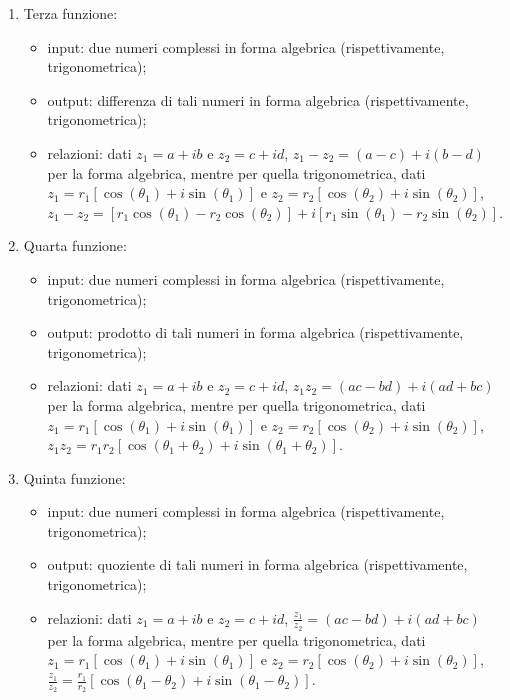 \documentclass[a4paper,10pt]{article}
\begin{document}
\begin{enumerate}
\begin{itemize}
	    \end{itemize}
	\item Terza funzione:
	    \begin{itemize}
	    	\item input: due numeri complessi in forma algebrica (rispettivamente, trigonometrica);
		\item output: differenza di tali numeri in forma algebrica (rispettivamente, trigonometrica);
		\item relazioni: dati $ z_1 = a + ib $ e $ z_2 = c + id $, $ z_1 - z_2 = (a - c) + i(b - d) $
		per la forma algebrica, mentre per quella trigonometrica, dati $ z_1 = r_1[\cos(\theta_1) + i\sin(\theta_1)] $
		e $ z_2 = r_2[\cos(\theta_2) + i\sin(\theta_2)] $, $ z_1 - z_2 = [r_1\cos(\theta_1) - r_2\cos(\theta_2)] +
		i[r_1\sin(\theta_1) - r_2\sin(\theta_2)] $.
	    \end{itemize}
	\item Quarta funzione:
	    \begin{itemize}
	    	\item input: due numeri complessi in forma algebrica (rispettivamente, trigonometrica);
		\item output: prodotto di tali numeri in forma algebrica (rispettivamente, trigonometrica);
		\item relazioni: dati $ z_1 = a + ib $ e $ z_2 = c + id $, $ z_1z_2 = (ac - bd) + i(ad + bc) $
		per la forma algebrica, mentre per quella trigonometrica, dati $ z_1 = r_1[\cos(\theta_1) + i\sin(\theta_1)] $
		e $ z_2 = r_2[\cos(\theta_2) + i\sin(\theta_2)] $, $ z_1z_2 = r_1r_2[\cos(\theta_1 + \theta_2) + 
		i\sin(\theta_1 + \theta_2)] $.
	    \end{itemize}
	\item Quinta funzione:
	    \begin{itemize}
	    	\item input: due numeri complessi in forma algebrica (rispettivamente, trigonometrica);
		\item output: quoziente di tali numeri in forma algebrica (rispettivamente, trigonometrica);
		\item relazioni: dati $ z_1 = a + ib $ e $ z_2 = c + id $, $ \frac{z_1}{z_2} = (ac - bd) + i(ad + bc) $
		per la forma algebrica, mentre per quella trigonometrica, dati $ z_1 = r_1[\cos(\theta_1) + i\sin(\theta_1)] $
		e $ z_2 = r_2[\cos(\theta_2) + i\sin(\theta_2)] $, $ \frac{z_1}{z_2} = \frac{r_1}{r_2}[\cos(\theta_1 - \theta_2)
		+ i\sin(\theta_1 - \theta_2)] $.
	    \end{itemize}
\end{enumerate}
\end{document}
